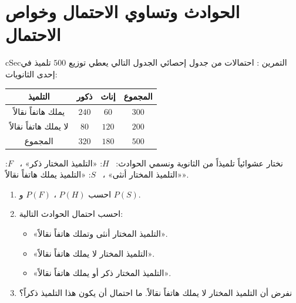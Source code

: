 \documentclass[12pt,a4paper]{article}
\newenvironment{BOX}[2]{\begin{otherlanguage}{english}\begin{arbox}{#1}{#2}}{\end{arbox}\end{otherlanguage}}
\newcounter{exo}
\newenvironment{tamrin}[1]{\stepcounter{exo}\begin{BOX}{cSec}{التمرين \theexo: #1}}{\end{BOX}}
\newcommand{\ar}[1]{\foreignlanguage{arabic}{#1}}
\newenvironment{sq}{\begin{itemize}[leftmargin=2.4em,itemsep=3pt]}{\end{itemize}}
\newcommand{\qa}{\item[(أ)]}\newcommand{\qb}{\item[(ب)]}\newcommand{\qc}{\item[(جـ)]}\newcommand{\qd}{\item[(د)]}\newcommand{\qe}{\item[(هـ)]}
\begin{document}
\section{الحوادث وتساوي الاحتمال وخواص الاحتمال}
\begin{tamrin}{احتمالات من جدول إحصائي}
الجدول التالي يعطي توزيع $500$ تلميذ في إحدى الثانويات:
\begin{center}
\renewcommand{\arraystretch}{1.4}
\begin{tabular}{|C|c|c|c|}\hline
{}التلميذ & \ar{ذكور} & \ar{إناث} & \ar{المجموع}\\
\hline
يملك هاتفاً نقالاً & $240$ & $60$ & $300$\\
\hline
لا يملك هاتفاً نقالاً & $80$ & $120$ & $200$\\
\hline
\ar{المجموع} & $320$ & $180$ & $500$\\
\hline
\end{tabular}
\end{center}
نختار عشوائياً تلميذاً من الثانوية ونسمي الحوادث: \ $H$: «التلميذ المختار ذكر» ، \ $F$: «التلميذ المختار أنثى» ، \ $S$: «التلميذ يملك هاتفاً نقالاً».
\begin{enumerate}
\item احسب $P(H)$ ، $P(F)$ و $P(S)$.
\item احسب احتمال الحوادث التالية:
\begin{sq}
\qa «التلميذ المختار أنثى وتملك هاتفاً نقالاً».
\qb «التلميذ المختار لا يملك هاتفاً نقالاً».
\qc «التلميذ المختار ذكر أو يملك هاتفاً نقالاً».
\end{sq}
\item نفرض أن التلميذ المختار لا يملك هاتفاً نقالاً. ما احتمال أن يكون هذا التلميذ ذكراً؟
\end{enumerate}
\end{tamrin}
\end{document}
